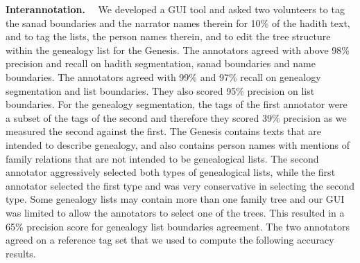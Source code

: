 \documentclass{llncs}
\begin{document}
{\bf Interannotation.}~~
We developed a GUI tool and asked two volunteers to tag the sanad boundaries and the narrator names therein for 10\% of the hadith text, 
and to tag the lists, the person names therein, and to edit the tree structure within the genealogy list for the Genesis.
The annotators agreed with above 98\% precision and recall on hadith segmentation, sanad boundaries and name boundaries.
The annotators agreed with 99\% and 97\% recall on genealogy segmentation and list boundaries.
They also scored 95\% precision on list boundaries.
For the genealogy segmentation, the tags of the first annotator were a subset of the tags of the second and therefore they scored  
39\% precision as we measured the second against the first.
The Genesis contains texts that are intended to describe genealogy, 
and also contains person names with mentions of family relations that are not intended to be genealogical lists.
The second annotator aggressively selected both types of genealogical lists, while the first annotator selected the first type and was 
very conservative in selecting the second type. 
Some genealogy lists may contain more than one family tree and our GUI was limited to allow the annotators to select one of the trees.
This resulted in a 65\% precision score for genealogy list boundaries agreement. 
The two annotators agreed on a reference tag set that we used to compute the following accuracy results. 


%
\end{document}
